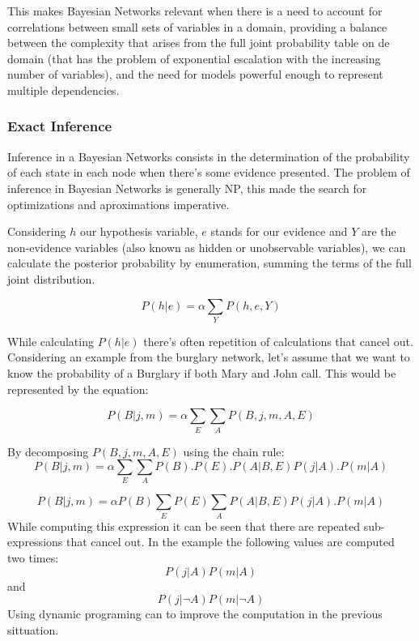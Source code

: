This makes Bayesian Networks relevant when there is a need to account for correlations between small sets of variables in a domain, providing a balance between the complexity that arises from the full joint probability table on de domain (that has the problem of exponential escalation with the increasing number of variables), and the need for models powerful enough to represent multiple dependencies. 

\subsubsection{Exact Inference}

Inference in a Bayesian Networks consists in the determination of the probability of each state in each node when there's some evidence presented.
The problem of inference in Bayesian Networks is generally NP, this made the search for optimizations and aproximations imperative. 

Considering $h$ our hypothesis variable, $e$ stands for our evidence and $Y$ are the non-evidence variables (also known as hidden or unobservable variables), we can calculate the posterior probability by enumeration, summing the terms of the full joint distribution.

\begin{equation}
P(h\vert e)=\alpha\sum_{Y}P(h,e,Y)
\end{equation}

While calculating $P(h\vert e)$ there's often repetition of calculations that cancel out. Considering an example from the burglary network, let's assume that we want to know the probability of a Burglary if both Mary and John call. This would be represented by the equation:

\begin{equation}
P(B\vert j,m)=\alpha\sum_{E}\sum_{A}P(B,j,m,A,E)
\end{equation}

By decomposing $P(B,j,m,A,E)$ using the chain rule:
\begin{equation}
P(B\vert j,m)=\alpha\sum_{E}\sum_{A}P(B).P(E).P(A\vert B,E)P(j\vert A).P(m\vert A)
\end{equation}

\begin{equation}
P(B\vert j,m)=\alpha P(B)\sum_{E}P(E)\sum_{A}P(A\vert B,E)P(j\vert A).P(m\vert A)
\end{equation}
While computing this expression it can be seen that there are repeated sub-expressions that cancel out. In the example the following values are computed two times: 
\begin{equation}
P(j\vert A)P(m\vert A)\end{equation} and \begin{equation}P(j\vert \lnot A)P(m\vert \lnot A)\end{equation} 
Using dynamic programing can to improve the computation in the previous sittuation.

